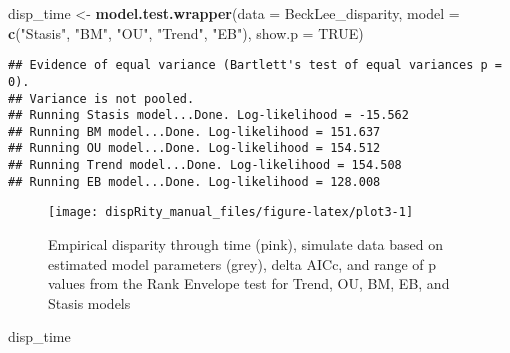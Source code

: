 \documentclass[
]{book}
\newenvironment{Shaded}{\begin{snugshade}}{\end{snugshade}}
\newcommand{\AttributeTok}[1]{\textcolor[rgb]{0.13,0.29,0.53}{#1}}
\newcommand{\ConstantTok}[1]{\textcolor[rgb]{0.56,0.35,0.01}{#1}}
\newcommand{\FunctionTok}[1]{\textcolor[rgb]{0.13,0.29,0.53}{\textbf{#1}}}
\newcommand{\NormalTok}[1]{#1}
\newcommand{\OtherTok}[1]{\textcolor[rgb]{0.56,0.35,0.01}{#1}}
\newcommand{\StringTok}[1]{\textcolor[rgb]{0.31,0.60,0.02}{#1}}
\begin{document}
\begin{Shaded}
\begin{Highlighting}[]
\NormalTok{disp\_time }\OtherTok{\textless{}{-}} \FunctionTok{model.test.wrapper}\NormalTok{(}\AttributeTok{data =}\NormalTok{ BeckLee\_disparity,}
                    \AttributeTok{model =} \FunctionTok{c}\NormalTok{(}\StringTok{"Stasis"}\NormalTok{, }\StringTok{"BM"}\NormalTok{, }\StringTok{"OU"}\NormalTok{, }\StringTok{"Trend"}\NormalTok{, }\StringTok{"EB"}\NormalTok{),}
                                \AttributeTok{show.p =} \ConstantTok{TRUE}\NormalTok{)}
\end{Highlighting}
\end{Shaded}

\begin{verbatim}
## Evidence of equal variance (Bartlett's test of equal variances p = 0).
## Variance is not pooled.
## Running Stasis model...Done. Log-likelihood = -15.562
## Running BM model...Done. Log-likelihood = 151.637
## Running OU model...Done. Log-likelihood = 154.512
## Running Trend model...Done. Log-likelihood = 154.508
## Running EB model...Done. Log-likelihood = 128.008
\end{verbatim}

\begin{figure}

{\centering \texttt{[image: dispRity\_manual\_files/figure-latex/plot3-1]} 

}

\caption{Empirical disparity through time (pink), simulate data based on estimated model parameters (grey), delta AICc, and range of p values from the Rank Envelope test for Trend, OU, BM, EB, and Stasis models}\label{fig:plot3}
\end{figure}

\begin{Shaded}
\begin{Highlighting}[]
\NormalTok{disp\_time}
\end{Highlighting}
\end{Shaded}
\end{document}
